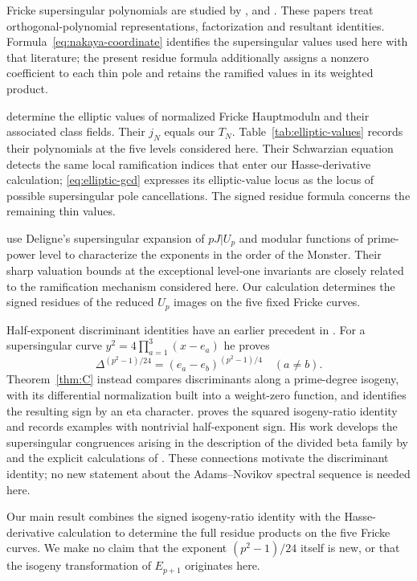 \documentclass[11pt,a4paper]{article}
\numberwithin{equation}{section}
\theoremstyle{definition}
\theoremstyle{remark}
\begin{document}
Fricke supersingular polynomials are studied by \citet{Sakai11,Sakai14},
\citet{Nakaya19} and \citet{Morton23}. These papers treat
orthogonal-polynomial representations, factorization and resultant
identities. Formula~\eqref{eq:nakaya-coordinate} identifies the supersingular
values used here with that literature; the present residue formula additionally
assigns a nonzero coefficient to each thin pole and retains the ramified values
in its weighted product.

\citet[\S4.2, Table~1 and Appendix~C]{JST19} determine the elliptic values
of normalized Fricke Hauptmoduln and their associated class fields. Their
$j_N$ equals our $T_N$. Table~\ref{tab:elliptic-values} records their
polynomials at the five levels considered here. Their Schwarzian equation
detects the same local ramification indices that enter our Hasse-derivative
calculation; \eqref{eq:elliptic-gcd} expresses its elliptic-value locus as
the locus of possible supersingular pole cancellations. The signed residue
formula concerns the remaining thin values.

\citet[Proposition~3.1 and \S4]{DS26} use Deligne's
supersingular expansion of $pJ|U_p$ and modular functions of prime-power level
to characterize the exponents in the order of the Monster. Their sharp
valuation bounds at the exceptional level-one invariants are closely related
to the ramification mechanism considered here. Our calculation determines the
signed residues of the reduced $U_p$ images on the five fixed Fricke curves.

Half-exponent discriminant identities have an earlier precedent in
\citet[Theorem~3, p.~72; \S4]{Landweber88}. For a supersingular curve
$y^2=4\prod_{a=1}^3(x-e_a)$ he proves
\[
\Delta^{(p^2-1)/24}=(e_a-e_b)^{(p^2-1)/4}\quad(a\ne b).
\]
Theorem~\ref{thm:C} instead compares discriminants along a prime-degree isogeny,
with its differential normalization built into a weight-zero function, and identifies
the resulting sign by an eta character. \citet[Theorem~1.2 and Remark~4]{Ono25}
proves the squared isogeny-ratio identity and records examples with nontrivial
half-exponent sign. His work develops the supersingular congruences arising in
the description of the divided beta family by \citet[Theorem~1.2]{Behrens09}
and the explicit calculations of \citet[\S5.4, Conjecture~5.17]{Larson20}.
These connections motivate the discriminant identity; no new statement about the
Adams--Novikov spectral sequence is needed here.

Our main result combines the signed isogeny-ratio identity with the Hasse-derivative
calculation to determine the full residue products on the five Fricke curves.
We make no claim that the exponent $(p^2-1)/24$ itself is new, or that the
isogeny transformation of $E_{p+1}$ originates here.
\end{document}
